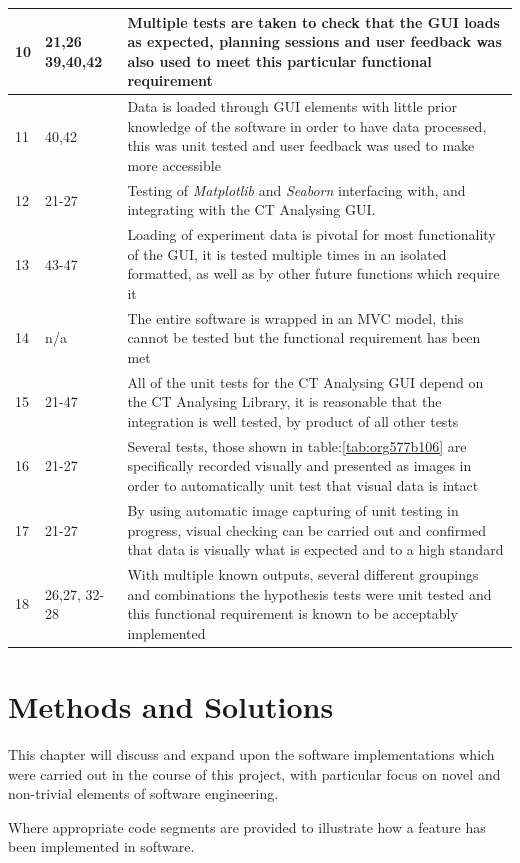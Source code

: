 \documentclass[11pt]{report}
\begin{document}
\begin{longtable}{|l|l|p{14cm}|}
\hline
10 & 21,26 39,40,42 & Multiple tests are taken to check that the GUI loads as expected, planning sessions and user feedback was also used to meet this particular functional requirement\\
\hline
11 & 40,42 & Data is loaded through GUI elements with little prior knowledge of the software in order to have data processed, this was unit tested and user feedback was used to make more accessible\\
\hline
12 & 21-27 & Testing of \emph{Matplotlib} and \emph{Seaborn} interfacing with, and integrating with the CT Analysing GUI.\\
\hline
13 & 43-47 & Loading of experiment data is pivotal for most functionality of the GUI, it is tested multiple times in an isolated formatted, as well as by other future functions which require it\\
\hline
14 & n/a & The entire software is wrapped in an MVC model, this cannot be tested but the functional requirement has been met\\
\hline
15 & 21-47 & All of the unit tests for the CT Analysing GUI depend on the CT Analysing Library, it is reasonable that the integration is well tested, by product of all other tests\\
\hline
16 & 21-27 & Several tests, those shown in table:\ref{tab:org577b106} are specifically recorded visually and presented as images in order to automatically unit test that visual data is intact\\
\hline
17 & 21-27 & By using automatic image capturing of unit testing in progress, visual checking can be carried out and confirmed that data is visually what is expected and to a high standard\\
\hline
18 & 26,27, 32-28 & With multiple known outputs, several different groupings and combinations the hypothesis tests were unit tested and this functional requirement is known to be acceptably implemented\\
\hline
\end{longtable}

\chapter{Methods and Solutions}
\label{sec:orgb302f70}
This chapter will discuss and expand upon the software implementations which were carried out in the course of this project, with particular focus on novel and non-trivial elements of software engineering.

Where appropriate code segments are provided to illustrate how a feature has been implemented in software.
\end{document}

